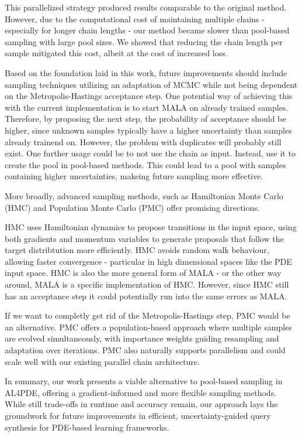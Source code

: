 This parallelized strategy produced results comparable to the original method. However, due to the computational cost of maintaining multiple chains - especially for longer chain lengths - our method became slower than pool-based sampling with large pool sizes. We showed that reducing the chain length per sample mitigated this cost, albeit at the cost of increased loss.

Based on the foundation laid in this work, future improvements should include sampling techniques utilizing an adaptation of MCMC while not being dependent on the Metropolis-Hastings acceptance step. One potential way of achieving this with the current implementation is to start MALA on already trained samples. Therefore, by proposing the next step, the probability of acceptance should be higher, since unknown samples typically have a higher uncertainty than samples already trainend on. However, the problem with duplicates will probably still exist. One further usage could be to not use the chain as input. Instead, use it to create the pool in pool-based methods. This could lead to a pool with samples containing higher uncertainties, makeing future sampling more effective.

More broadly, advanced sampling methods, such as Hamiltonian Monte Carlo (HMC) and Population Monte Carlo (PMC) offer promising directions. 

HMC uses Hamiltonian dynamics to propose transitions in the input space, using both gradients and momentum variables to generate proposals that follow the target distribtution more efficiently. HMC avoids random walk behaviour, allowing faster convergence - particular in high dimensional spaces like the PDE input space. HMC is also the more general form of MALA - or the other way around, MALA is a specific implementation of HMC. However, since HMC still has an acceptance step it could potentially run into the same errors as MALA.

If we want to completly get rid of the Metropolis-Hastings step, PMC would be an alternative. PMC offers a population-based approach where multiple samples are evolved simultaneously, with importance weights guiding resampling and adaptation over iterations. PMC also naturally supports parallelism and could scale well with our existing parallel chain architecture.

In summary, our work presents a viable alternative to pool-based sampling in AL4PDE, offering a gradient-informed and more flexible sampling methods. While still trade-offs in runtime and accuracy remain, our approach lays the groundwork for future improvements in efficient, uncertainty-guided query synthesis for PDE-based learning frameworks.